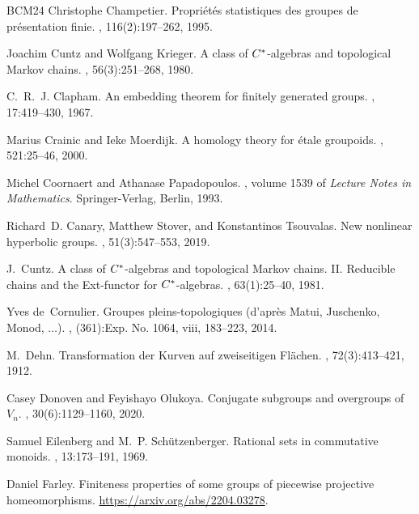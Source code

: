 \documentclass[11pt,letterpaper]{amsart}
\theoremstyle{definition}
\begin{document}
\begin{thebibliography}{BCM{\etalchar{+}}24}
Christophe Champetier.
\newblock Propri\'et\'es statistiques des groupes de pr\'esentation finie.
, 116(2):197--262, 1995.

Joachim Cuntz and Wolfgang Krieger.
\newblock A class of {$C\sp{\ast} $}-algebras and topological {M}arkov chains.
, 56(3):251--268, 1980.

C.~R.~J. Clapham.
\newblock An embedding theorem for finitely generated groups.
, 17:419--430, 1967.

Marius Crainic and Ieke Moerdijk.
\newblock A homology theory for \'{e}tale groupoids.
, 521:25--46, 2000.

Michel Coornaert and Athanase Papadopoulos.
, volume 1539 of {\em
  Lecture Notes in Mathematics}.
\newblock Springer-Verlag, Berlin, 1993.

Richard~D. Canary, Matthew Stover, and Konstantinos Tsouvalas.
\newblock New nonlinear hyperbolic groups.
, 51(3):547--553, 2019.

J.~Cuntz.
\newblock A class of {$C\sp{\ast} $}-algebras and topological {M}arkov chains.
  {II}. {R}educible chains and the {E}xt-functor for {$C\sp{\ast} $}-algebras.
, 63(1):25--40, 1981.

Yves de~Cornulier.
\newblock Groupes pleins-topologiques (d'apr\`es {M}atui, {J}uschenko, {M}onod,
  {$\ldots$}).
, (361):Exp. No. 1064, viii, 183--223, 2014.

M.~Dehn.
\newblock Transformation der {K}urven auf zweiseitigen {F}l\"{a}chen.
, 72(3):413--421, 1912.

Casey Donoven and Feyishayo Olukoya.
\newblock Conjugate subgroups and overgroups of {$V_n$}.
, 30(6):1129--1160, 2020.

Samuel Eilenberg and M.~P. Sch\"{u}tzenberger.
\newblock Rational sets in commutative monoids.
, 13:173--191, 1969.

Daniel Farley.
\newblock Finiteness properties of some groups of piecewise projective
  homeomorphisms.
\newblock \url{https://arxiv.org/abs/2204.03278}.


\end{thebibliography}
\end{document}
